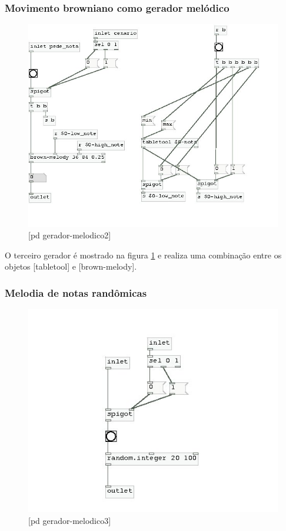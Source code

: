 \documentclass{ppgmus}
\begin{document}
\subsubsection{Movimento browniano como gerador melódico}


\begin{figure}[!ht]
\includegraphics[scale=.6]{gera-melodico2}
\caption{[pd gerador-melodico2]}
\label{gera-melodico2}
\end{figure}  


O terceiro gerador é mostrado na figura \ref{gera-melodico2} e
realiza uma combinação entre os objetos [tabletool] e [brown-melody].


\subsubsection{Melodia  de notas randômicas}


\begin{figure}[!ht]
\includegraphics[scale=.6]{gera-melodico3}
\caption{[pd gerador-melodico3]}
\label{gera-melodico3}
\end{figure}  
\end{document}
